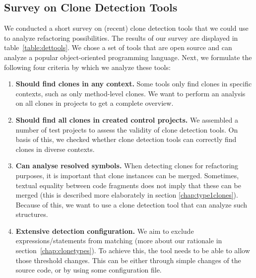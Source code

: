 \documentclass[a4paper]{article}
\begin{document}
\subsection{Survey on Clone Detection Tools}
\label{ch:tool-overview}
We conducted a short survey on (recent) clone detection tools that we could use to analyze refactoring possibilities. The results of our survey are displayed in table~\ref{table:dettools}. We chose a set of tools that are open source and can analyze a popular object-oriented programming language. Next, we formulate the following four criteria by which we analyze these tools:
\begin{enumerate}
    \item \textbf{Should find clones in any context.} Some tools only find clones in specific contexts, such as only method-level clones. We want to perform an analysis on all clones in projects to get a complete overview.
\item \textbf{Should find all clones in created control projects.} We assembled a number of test projects to assess the validity of clone detection tools. On basis of this, we checked whether clone detection tools can correctly find clones in diverse contexts.
\item \textbf{Can analyse resolved symbols.} When detecting clones for refactoring purposes, it is important that clone instances can be merged. Sometimes, textual equality between code fragments does not imply that these can be merged (this is described more elaborately in section \ref{chap:type1clones}). Because of this, we want to use a clone detection tool that can analyze such structures.
\item \textbf{Extensive detection configuration.} We aim to exclude expressions/statements from matching (more about our rationale in section~\ref{chap:clonetypes}). To achieve this, the tool needs to be able to allow those threshold changes. This can be either through simple changes of the source code, or by using some configuration file.
\end{enumerate}
\end{document}
